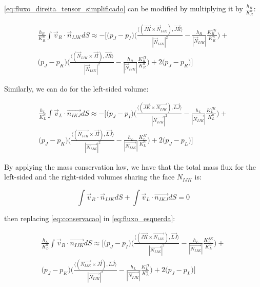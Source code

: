 \documentclass{article}
\begin{document}
\ref{eq:fluxo_direita_tensor_simplificado} can be modified by multiplying it by $\frac{h_{R}}{K^n_{R}}$:

\begin{equation} \label{eq:fluxo_direita_final}
\begin{split}
\frac{h_{R}}{K^n_{R}}\int{\vec{v}_{R} \cdot \vec{n}_{IJK}dS} 
 \approx -\Bigg[ \big( p_{J} - p_{I}\big) \Bigg(\frac{\langle(\vec{JK} \times \vec{N}_{IJK}), \vec{JR}\rangle}{|\vec{N}_{IJK}| ^2}  - \frac{h_{R}}{|\vec{N}_{IJK}|}\frac{K^{JK}_{R}}{K^{n}_{R}}\Bigg) + \\
\big( p_{J} - p_{K} \big) \Bigg(\frac{\langle(\vec{N}_{IJK} \times \vec{JI}), \vec{JR}\rangle}{|\vec{N}_{IJK}| ^ 2} - \frac{h_{R}}{|\vec{N}_{IJK}|}\frac{K^{JI}_{R}}{K^n_{R}}\Bigg)  + 
2 \big(p_{J} - p_{R}\big) \Bigg]
\end{split}
\end{equation}

Similarly, we can do for the left-sided volume:

\begin{equation} \label{eq:fluxo_esquerda}
\begin{split}
\frac{h_{L}}{K^n_{L}}\int{\vec{v}_{L} \cdot \vec{n_{IKJ}}dS} \approx -\Bigg[ \big(p_{J} - p_{I}\big) \Bigg(\frac{\langle(\vec{JK} \times \vec{N_{IJK}}), \vec{LJ}\rangle}{|\vec{N_{IJK}}| ^2}  - \frac{h_{L}}{|\vec{N_{IJK}}|}\frac{K^{JK}_{L}}{K^n_{L}}\Bigg)  + \\
 \big( p_{J} -  p_{K}\big) \Bigg(  \frac{\langle(\vec{N_{IJK}} \times \vec{JI}), \vec{LJ}\rangle}{|\vec{N_{IJK}}| ^2} - \frac{h_{L}}{|\vec{N_{IJK}}|} \frac{K^{JI}_{L}}{K^n_{L}} \Bigg) + 2\big( p_{J} - p_{L}\big)\Bigg]
\end{split}
\end{equation}

By applying the mass conservation law, we have that the total mass flux for the left-sided and the right-sided volumes sharing the face $N_{IJK}$ is:

\begin{equation} \label{eq:conservacao}
\int{\vec{v}_{R} \cdot \vec{n}_{IJK}dS} +\int{\vec{v}_{L} \cdot \vec{n_{IKJ}}dS} = 0
\end{equation}

then replacing \ref{eq:conservacao} in \ref{eq:fluxo_esquerda}:

\begin{equation} \label{eq:fluxo_esquerda_substituicao}
\begin{split}
\frac{h_{L}}{K^n_{L}}\int{\vec{v}_{R} \cdot \vec{n_{IJK}}dS} \approx \Bigg[ \big(p_{J} - p_{I}\big) \Bigg(\frac{\langle(\vec{JK} \times \vec{N_{IJK}}), \vec{LJ}\rangle}{|\vec{N_{IJK}}| ^2} - \frac{h_{L}}{|\vec{N_{IJK}}|}\frac{K^{JK}_{L}}{K^n_{L}}\Bigg)  + \\
 \big( p_{J} -  p_{K}\big) \Bigg( \frac{\langle(\vec{N_{IJK}} \times \vec{JI}), \vec{LJ}\rangle}{|\vec{N_{IJK}}| ^2} - \frac{h_{L}}{|\vec{N_{IJK}}|} \frac{K^{JI}_{L}}{K^n_{L}} \Bigg) + 2\big( p_{J} - p_{L}\big)\Bigg]
\end{split}
\end{equation}
\end{document}
